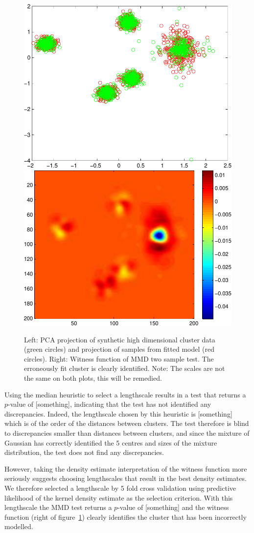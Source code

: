 \documentclass{article} %
\begin{document}
\begin{figure}[ht]
\centering
\includegraphics[width=0.4\columnwidth]{figures/high_mog_fa}
\hspace{0.1\columnwidth}
\includegraphics[width=0.4\columnwidth]{figures/high_mog_witness}
\caption{
Left: PCA projection of synthetic high dimensional cluster data (green circles) and projection of samples from fitted model (red circles).
Right: Witness function of MMD two sample test. The erroneously fit cluster is clearly identified.
Note: The scales are not the same on both plots, this will be remedied.
}
\label{fig:high_mog}
\end{figure}

Using the median heuristic to select a lengthscale results in a test that returns a $p$-value of [something], indicating that the test has not identified any discrepancies.
Indeed, the lengthscale chosen by this heuristic is [something] which is of the order of the distances between clusters.
The test therefore is blind to discrepancies smaller than distances between clusters, and since the mixture of Gaussian has correctly identified the 5 centres and sizes of the mixture distribution, the test does not find any discrepancies.

However, taking the density estimate interpretation of the witness function more seriously suggests choosing lengthscales that result in the best density estimates.
We therefore selected a lengthscale by 5 fold cross validation using predictive likelihood of the kernel density estimate as the selection criterion.
With this lengthscale the MMD test returns a $p$-value of [something] and the witness function (right of figure~\ref{fig:high_mog}) clearly identifies the cluster that has been incorrectly modelled.
\end{document}
